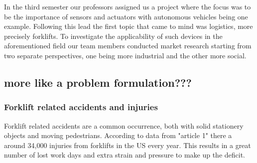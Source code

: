 \documentclass[../report.tex]{subfiles}
\begin{document}





    In the third semester our professors assigned us a project where
    the focus was to be the importance of sensors and actuators with
    autonomous vehicles being one example. Following this lead the first
    topic that came to mind was logistics, more precisely forklifts.
    To investigate the applicability of such devices in the 
    aforementioned field our team members conducted market research 
    starting from two separate perspectives, one being more 
    industrial and the other more social.

    \subsection{more like a problem formulation???}
    \subsubsection{Forklift related accidents and injuries}
    Forklift related accidents are a common occurrence, both with solid
    stationery objects and moving pedestrians. According to data from "article
    1" there a around 34,000 injuries from forklifts in the US every year. This
    results in a great number of lost work days and extra strain and 
    pressure to make up the deficit.
\end{document}
